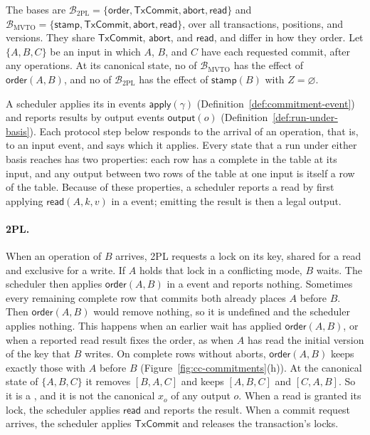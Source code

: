 The bases are
$\mathcal B_{\mathrm{2PL}}=\{\mathsf{order},\mathsf{TxCommit},\mathsf{abort},\mathsf{read}\}$
and
$\mathcal B_{\mathrm{MVTO}}=\{\mathsf{stamp},\mathsf{TxCommit},\mathsf{abort},\mathsf{read}\}$,
over all transactions, positions, and versions.  They share
$\mathsf{TxCommit}$, $\mathsf{abort}$, and $\mathsf{read}$, and differ in how
they order.  Let $\{A,B,C\}$ be an input in which $A$, $B$, and $C$ have each
requested commit, after any operations.  At its canonical state, no \commitment
of $\mathcal B_{\mathrm{MVTO}}$ has the effect of $\mathsf{order}(A,B)$, and no
\commitment of $\mathcal B_{\mathrm{2PL}}$ has the effect of $\mathsf{stamp}(B)$
with $Z=\varnothing$.

A scheduler applies its \commitments in \commitment events
$\mathsf{apply}(\gamma)$ (Definition~\ref{def:commitment-event}) and reports
results by output events $\mathsf{output}(o)$
(Definition~\ref{def:run-under-basis}).  Each protocol step below responds to
the arrival of an operation, that is, to an input event, and says which
\commitments it applies.  Every state that a run under either basis reaches
has two properties: each row has a complete \outnoun in the table at its
input, and any output between two rows of the table at one input is itself a
row of the table.  Because of these properties, a scheduler reports a read by
first applying $\mathsf{read}(A,k,v)$ in a \commitment event; emitting the
result is then a legal output.

\paragraph{2PL.}
When an operation of $B$ arrives, 2PL requests a lock on its key, shared for a
read and exclusive for a write.  If $A$ holds that lock in a conflicting mode,
$B$ waits.  The scheduler then applies $\mathsf{order}(A,B)$ in a \commitment
event and reports nothing.  Sometimes every remaining complete row that
commits both already places $A$ before $B$.  Then $\mathsf{order}(A,B)$ would
remove nothing, so it is undefined and the scheduler applies nothing.  This
happens when an earlier wait has applied $\mathsf{order}(A,B)$, or when a
reported read result fixes the order, as when $A$ has read the initial version
of the key that $B$ writes.  On complete rows without aborts,
$\mathsf{order}(A,B)$ keeps exactly those with $A$ before $B$
(Figure~\ref{fig:cc-commitments}(h)).  At the canonical state of $\{A,B,C\}$
it removes $[B,A,C]$ and keeps $[A,B,C]$ and $[C,A,B]$.  So it is a
\commitment, and it is not the canonical \commitment $x_o$ of any output $o$.
When a read is granted its lock, the scheduler applies $\mathsf{read}$ and
reports the result.  When a commit request arrives, the scheduler applies
$\mathsf{TxCommit}$ and releases the transaction's locks.

